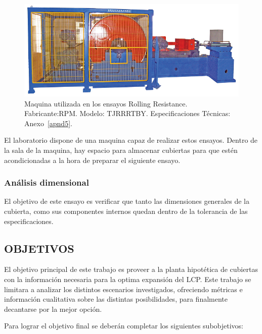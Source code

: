 \begin{figure}[H]
	\begin{center}
		\includegraphics[width=\textwidth]{fig/2_rr_machine}
	\end{center}
	\caption{Maquina utilizada en los ensayos Rolling Resistance. Fabricante:RPM. Modelo: TJRRRTBY. Especificaciones Técnicas: Anexo~\ref{apnd5}.}
	\label{fig:2_rr_machine}
\end{figure}

El laboratorio dispone de una maquina capaz de realizar estos ensayos.
Dentro de la sala de la maquina, hay espacio para almacenar cubiertas
para que estén acondicionadas a la hora de preparar el siguiente ensayo.

\subsubsection{Análisis dimensional}
El objetivo de este ensayo es verificar que
tanto las dimensiones generales de la cubierta,
como sus componentes internos
quedan dentro de la tolerancia de las especificaciones.

\subsection{OBJETIVOS}\label{sec_obj}
El objetivo principal de este trabajo
es proveer a la planta hipotética de cubiertas
con la información necesaria para la optima expansión del LCP.
Este trabajo se limitara a analizar los distintos escenarios investigados,
ofreciendo métricas e información cualitativa
sobre las distintas posibilidades,
para finalmente decantarse por la mejor opción.

Para lograr el objetivo final se deberán completar los siguientes subobjetivos:

